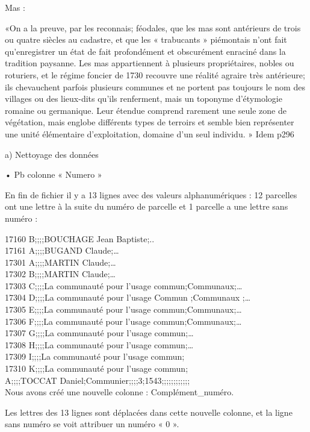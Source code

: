 Mas :

«On a la preuve, par les reconnais; féodales, que les mas sont antérieurs de trois ou quatre siècles au cadastre, et que les « trabucants » piémontais n’ont fait qu’enregistrer un état de fait profondément et obscurément enraciné dans la tradition paysanne. Les mas appartiennent à plusieurs propriétaires, nobles ou roturiers, et le régime foncier de 1730 recouvre une réalité agraire très antérieure; ils chevauchent parfois plusieurs communes et ne portent pas toujours le nom des villages ou des lieux-dits qu’ils renferment, mais un toponyme d’étymologie romaine ou germanique. Leur étendue comprend rarement une seule zone de végétation, mais englobe différents types de terroirs et semble bien représenter une unité élémentaire d'exploitation, domaine d’un seul individu. » Idem p296

a) Nettoyage des données

•	Pb colonne « Numero »

En fin de fichier il y a 13 lignes avec des valeurs alphanumériques : 12 parcelles ont une lettre à la suite du numéro de parcelle et 1 parcelle a une lettre sans numéro :

17160 B;;;;BOUCHAGE Jean Baptiste;..\\
17161 A;;;;BUGAND Claude;… \\
17301 A;;;;MARTIN Claude;… \\
17302 B;;;;MARTIN Claude;… \\
17303 C;;;;La communauté pour l'usage commun;Communaux;… \\
17304 D;;;;La communauté pour l'usage Commun ;Communaux ;… \\
17305 E;;;;La communauté pour l'usage commun;Communaux;…\\
17306 F;;;;La communauté pour l'usage commun;Communaux;… \\
17307 G;;;;La communauté pour l'usage commun;… \\
17308 H;;;;La communauté pour l'usage commun;…\\
17309 I;;;;La communauté pour l'usage commun;\\
17310 K;;;;La communauté pour l'usage commun;\\
A;;;;TOCCAT Daniel;Communier;;;;3;1543;;;;;;;;;;;;\\

Nous avons créé une nouvelle colonne : Complément_numéro.

Les lettres des 13 lignes sont déplacées dans cette nouvelle colonne, et la ligne sans numéro se voit attribuer un numéro « 0 ».

